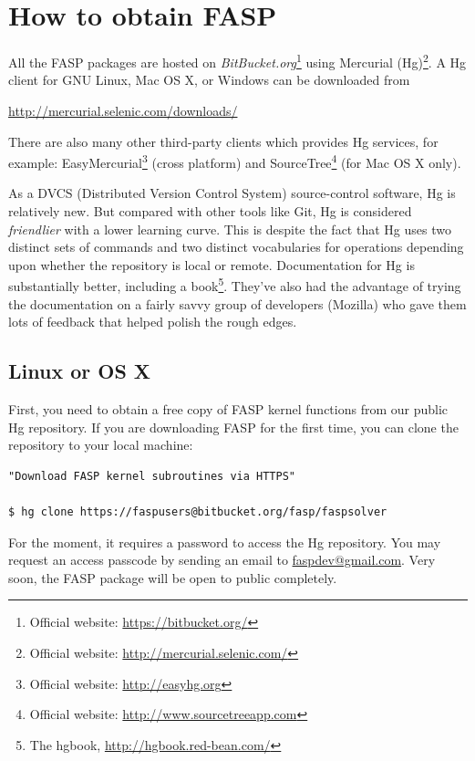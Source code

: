 \documentclass[11pt]{memoir}
\begin{document}
\section{How to obtain FASP}\label{sec:install}

All the FASP packages are hosted on \emph{BitBucket.org}\footnote{Official website: \url{https://bitbucket.org/}} using Mercurial (Hg)\footnote{Official website: \url{http://mercurial.selenic.com/}}. A Hg client for GNU Linux, Mac OS X, or Windows can be downloaded from
\begin{center}
  \url{http://mercurial.selenic.com/downloads/}
\end{center}
%
There are also many other third-party clients which provides Hg services, for example: EasyMercurial\footnote{Official website: \url{http://easyhg.org}} (cross platform) and SourceTree\footnote{Official website: \url{http://www.sourcetreeapp.com}} (for Mac OS X only).

As a DVCS (Distributed Version Control System) source-control software, Hg is relatively new. But compared with other tools like Git, Hg is considered \emph{friendlier} with a lower learning curve. This is despite the fact that Hg uses two distinct sets of commands and two distinct vocabularies for operations depending upon whether the repository is local or remote.
Documentation for Hg is substantially better, including a book\footnote{The hgbook, \url{http://hgbook.red-bean.com/}}. They've also had the advantage of trying the documentation on a fairly savvy group of developers (Mozilla) who gave them lots of feedback that helped polish the rough edges.

\subsection{Linux or OS X}
First, you need to obtain a free copy of FASP kernel functions from our public Hg repository. If you are downloading FASP for the first time, you can clone the repository to your local machine:
%
\begin{lstlisting}[numbers=none]
"Download FASP kernel subroutines via HTTPS"

$ hg clone https://faspusers@bitbucket.org/fasp/faspsolver
\end{lstlisting}
%
\begin{snugshade}\noindent
For the moment, it requires a password to access the Hg repository. You may request an access passcode by sending an email to \url{faspdev@gmail.com}. Very soon, the FASP package will be open to public completely.
\end{snugshade}
\end{document}
